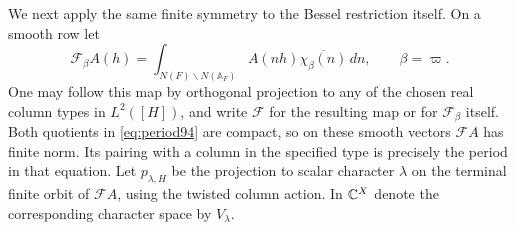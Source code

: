 \documentclass[a4paper,11pt]{article}
\theoremstyle{definition}
\theoremstyle{remark}
\numberwithin{equation}{section}
\begin{document}
We next apply the same finite symmetry to the Bessel restriction
itself. On a smooth row let
\[
    \mathcal F_\beta A(h)
       =\int_{N(F)\backslash N(\mathbb A_F)}
                    A(nh)\overline{\chi_\beta(n)}\,dn,\qquad
          \beta=\varpi .
\]
One may follow this map by orthogonal projection to any of the
chosen real column types in \(L^2([H])\), and write \(\mathcal F\)
for the resulting map or for \(\mathcal F_\beta\) itself. Both
quotients in \eqref{eq:period94} are compact, so on these smooth
vectors \(\mathcal F A\) has finite norm. Its pairing with a column
in the specified type is precisely the period in that equation.
Let \(p_{\lambda,H}\) be the projection to scalar character
\(\lambda\) on the terminal finite orbit of \(\mathcal F A\),
using the twisted column action. In \(\mathbb C^X\) denote the
corresponding character space by \(V_\lambda\).
\end{document}
